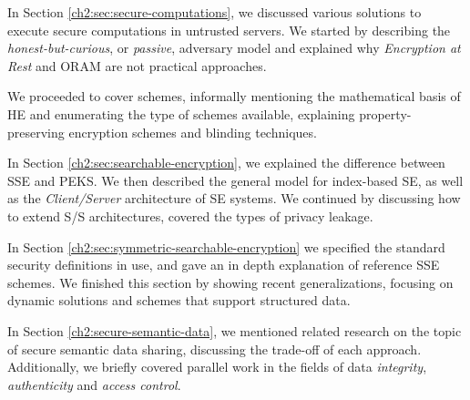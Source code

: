 In Section \ref{ch2:sec:secure-computations}, we discussed various solutions to execute secure computations in untrusted servers. We started by describing the \emph{honest-but-curious}, or \emph{passive}, adversary model and explained why \emph{Encryption at Rest} and \gls{ORAM} are not practical approaches. 

We proceeded to cover  schemes, informally mentioning the mathematical basis of \gls{HE} and enumerating the type of schemes available, explaining property-preserving encryption schemes and blinding techniques.

In Section \ref{ch2:sec:searchable-encryption}, we explained the difference between \gls{SSE} and \gls{PEKS}. We then described the general model for index-based \gls{SE}, as well as the \emph{Client/Server} architecture of \gls{SE} systems. We continued by discussing how to extend \gls{S/S} architectures, covered the types of privacy leakage.

In Section \ref{ch2:sec:symmetric-searchable-encryption} we specified the standard security definitions in use, and gave an in depth explanation of reference \gls{SSE} schemes. We finished this section by showing recent generalizations, focusing on dynamic solutions and schemes that support structured data.

In Section \ref{ch2:secure-semantic-data}, we mentioned related research on the topic of secure semantic data sharing, discussing the trade-off of each approach. Additionally, we briefly covered parallel work in the fields of data \emph{integrity}, \emph{authenticity} and \emph{access control}. 